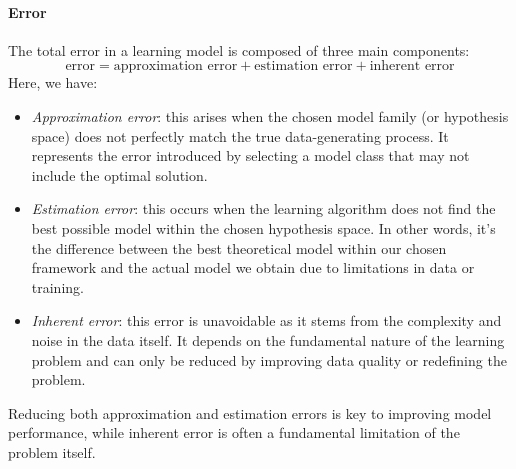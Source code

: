 \paragraph*{Error}
The total error in a learning model is composed of three main components:
\[\text{error} = \text{approximation error} + \text{estimation error} + \text{inherent error}\]
\noindent Here, we have: 
\begin{itemize}
    \item \textit{Approximation error}: this arises when the chosen model family (or hypothesis space) does not perfectly match the true data-generating process. 
        It represents the error introduced by selecting a model class that may not include the optimal solution.
    \item \textit{Estimation error}: this occurs when the learning algorithm does not find the best possible model within the chosen hypothesis space. 
        In other words, it's the difference between the best theoretical model within our chosen framework and the actual model we obtain due to limitations in data or training.
        \item \textit{Inherent error}: this error is unavoidable as it stems from the complexity and noise in the data itself. 
        It depends on the fundamental nature of the learning problem and can only be reduced by improving data quality or redefining the problem. 
\end{itemize}
\noindent Reducing both approximation and estimation errors is key to improving model performance, while inherent error is often a fundamental limitation of the problem itself.

